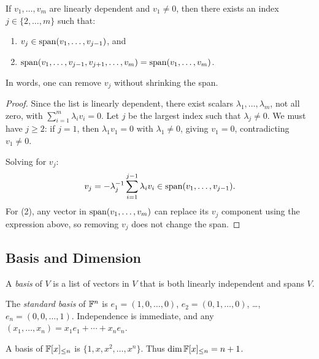 \documentclass[11pt,a4paper]{article}
\begin{document}
\begin{lemma}
\label{lem:linear_dependence}
If $v_1, \ldots, v_m$ are linearly dependent and $v_1 \neq 0$, then there
exists an index $j \in \{2, \ldots, m\}$ such that:
\begin{enumerate}[nosep]
  \item $v_j \in \operatorname{span}(v_1, \ldots, v_{j-1})$, and
  \item $\operatorname{span}(v_1, \ldots, v_{j-1}, v_{j+1}, \ldots, v_m)
         = \operatorname{span}(v_1, \ldots, v_m)$.
\end{enumerate}
In words, one can remove $v_j$ without shrinking the span.
\end{lemma}

\begin{proof}
Since the list is linearly dependent, there exist scalars
$\lambda_1, \ldots, \lambda_m$, not all zero, with
$\sum_{i=1}^{m} \lambda_i v_i = 0$.  Let $j$ be the largest index such that
$\lambda_j \neq 0$.  We must have $j \geq 2$: if $j = 1$, then
$\lambda_1 v_1 = 0$ with $\lambda_1 \neq 0$, giving $v_1 = 0$, contradicting
$v_1 \neq 0$.

Solving for $v_j$:
\[
  v_j = -\lambda_j^{-1} \sum_{i=1}^{j-1} \lambda_i v_i
  \in \operatorname{span}(v_1, \ldots, v_{j-1}).
\]
For (2), any vector in $\operatorname{span}(v_1, \ldots, v_m)$ can replace its $v_j$
component using the expression above, so removing $v_j$ does not change
the span.
\end{proof}

\subsection{Basis and Dimension}

\begin{definition}[Basis]
\label{def:basis}
A \emph{basis} of $V$ is a list of vectors in $V$ that is both linearly
independent and spans $V$.
\end{definition}

\begin{example}
\label{ex:standard_basis}
The \emph{standard basis} of $\mathbb{F}^n$ is $e_1 = (1,0,\ldots,0)$,
$e_2 = (0,1,\ldots,0)$, \ldots, $e_n = (0,0,\ldots,1)$.  Independence is
immediate, and any $(x_1, \ldots, x_n) = x_1 e_1 + \cdots + x_n e_n$.
\end{example}

\begin{example}
\label{ex:polynomial_basis}
A basis of $\mathbb{F}[x]_{\leq n}$ is $\{1, x, x^2, \ldots, x^n\}$.  Thus
$\dim \mathbb{F}[x]_{\leq n} = n + 1$.
\end{example}
\end{document}
